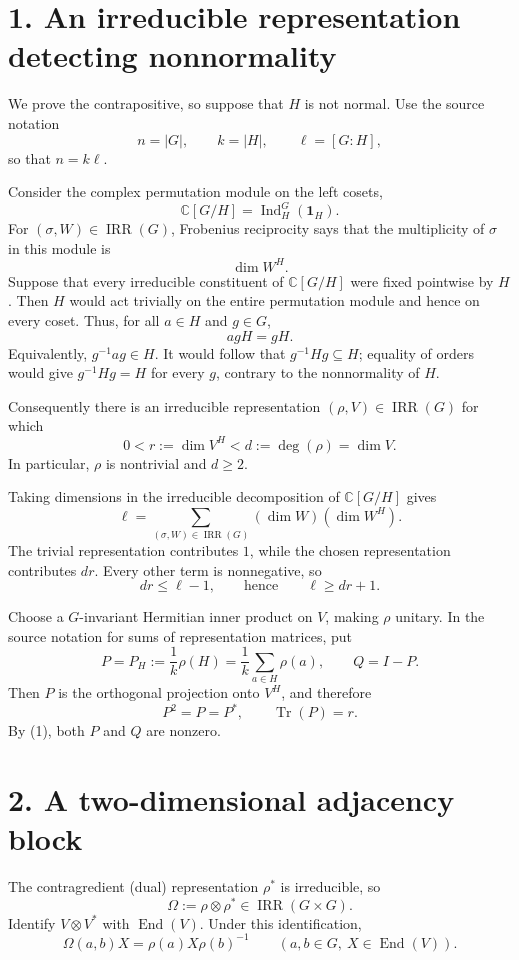 \documentclass[11pt]{article}
\begin{document}
\section*{1. An irreducible representation detecting nonnormality}

We prove the contrapositive, so suppose that \(H\) is not normal. Use the
source notation
\[
 n=|G|,\qquad k=|H|,\qquad \ell=[G:H],
\]
so that \(n=k\ell\).

Consider the complex permutation module on the left cosets,
\[
 \mathbb C[G/H]=\operatorname{Ind}_H^G(\mathbf 1_H).
\]
For \((\sigma,W)\in\operatorname{IRR}(G)\), Frobenius reciprocity says that
the multiplicity of \(\sigma\) in this module is
\[
 \dim W^H.
\]
Suppose that every irreducible constituent of \(\mathbb C[G/H]\) were
fixed pointwise by \(H\). Then \(H\) would act trivially on the entire
permutation module and hence on every coset. Thus, for all \(a\in H\) and
\(g\in G\),
\[
 agH=gH.
\]
Equivalently, \(g^{-1}ag\in H\). It would follow that
\(g^{-1}Hg\subseteq H\); equality of orders would give
\(g^{-1}Hg=H\) for every \(g\), contrary to the nonnormality of \(H\).

Consequently there is an irreducible representation
\((\rho,V)\in\operatorname{IRR}(G)\) for which
\[
 0<r:=\dim V^H<d:=\deg(\rho)=\dim V. \tag{1}
\]
In particular, \(\rho\) is nontrivial and \(d\geq2\).

Taking dimensions in the irreducible decomposition of
\(\mathbb C[G/H]\) gives
\[
 \ell=\sum_{(\sigma,W)\in\operatorname{IRR}(G)}
       (\dim W)(\dim W^H).
\]
The trivial representation contributes \(1\), while the chosen
representation contributes \(dr\). Every other term is nonnegative, so
\[
 dr\leq \ell-1,\qquad\text{hence}\qquad \ell\geq dr+1. \tag{2}
\]

Choose a \(G\)-invariant Hermitian inner product on \(V\), making \(\rho\)
unitary. In the source notation for sums of representation matrices, put
\[
 P=P_H:=\frac{1}{k}\rho(H)
       =\frac{1}{k}\sum_{a\in H}\rho(a),
 \qquad Q=I-P.
\]
Then \(P\) is the orthogonal projection onto \(V^H\), and therefore
\[
 P^2=P=P^*,\qquad \operatorname{Tr}(P)=r. \tag{3}
\]
By (1), both \(P\) and \(Q\) are nonzero.

\section*{2. A two-dimensional adjacency block}

The contragredient (dual) representation \(\rho^*\) is irreducible, so
\[
 \Omega:=\rho\otimes\rho^*\in\operatorname{IRR}(G\times G).
\]
Identify \(V\otimes V^*\) with \(\operatorname{End}(V)\). Under this
identification,
\[
 \Omega(a,b)X=\rho(a)X\rho(b)^{-1}
 \qquad(a,b\in G,\ X\in\operatorname{End}(V)). \tag{4}
\]
\end{document}

